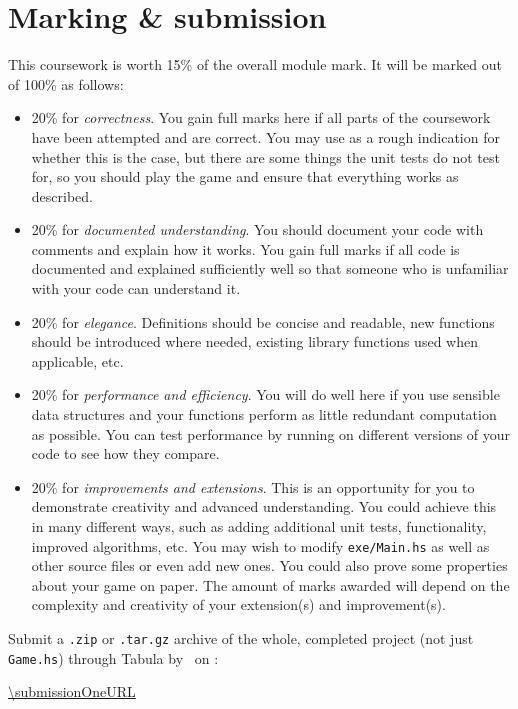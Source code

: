 
\section{Marking \& submission}

This coursework is worth 15\% of the overall module mark. It will be marked out of 100\% as follows:
\begin{itemize}
\item 20\% for \emph{correctness}. You gain full marks here if all parts of the coursework have been attempted and are correct. You may use  as a rough indication for whether this is the case, but there are some things the unit tests do not test for, so you should play the game and ensure that everything works as described.
\item 20\% for \emph{documented understanding}. You should document your code with comments and explain how it works. You gain full marks if all code is documented and explained sufficiently well so that someone who is unfamiliar with your code can understand it.
\item 20\% for \emph{elegance}. Definitions should be concise and readable, new functions should be introduced where needed, existing library functions used when applicable, etc. 
\item 20\% for \emph{performance and efficiency}. You will do well here if you use sensible data structures and your functions perform as little redundant computation as possible. You can test performance by running  on different versions of your code to see how they compare. 
\item 20\% for \emph{improvements and extensions}. This is an opportunity for you to demonstrate creativity and advanced understanding. You could achieve this in many different ways, such as adding additional unit tests, functionality, improved algorithms, etc. You may wish to modify \texttt{\small exe/Main.hs} as well as other source files or even add new ones. You could also prove some properties about your game on paper. The amount of marks awarded will depend on the complexity and creativity of your extension(s) and improvement(s).
\end{itemize}
Submit a \texttt{\small .zip} or \texttt{\small .tar.gz} archive of the whole, completed project (not just \texttt{\small Game.hs}) through Tabula by \deadlineOneTime\ on \deadlineOneDate:
\begin{center} 
	\url{\submissionOneURL}
\end{center}
